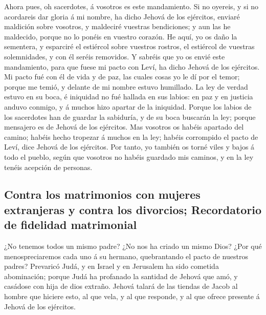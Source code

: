  Ahora pues, oh sacerdotes, á vosotros es este
mandamiento.  Si no oyereis, y si no acordareis dar gloria
á mi nombre, ha dicho Jehová de los ejércitos, enviaré maldición sobre
vosotros, y maldeciré vuestras bendiciones; y aun las he maldecido,
porque no lo ponéis en vuestro corazón.  He aquí, yo os
daño la sementera, y esparciré el estiércol sobre vuestros rostros, el
estiércol de vuestras solemnidades, y con él seréis removidos.
 Y sabréis que yo os envié este mandamiento, para que
fuese mi pacto con Leví, ha dicho Jehová de los ejércitos.
 Mi pacto fué con él de vida y de paz, las cuales cosas yo
le dí por el temor; porque me temió, y delante de mi nombre estuvo
humillado.  La ley de verdad estuvo en su boca, é
iniquidad no fué hallada en sus labios: en paz y en justicia anduvo
conmigo, y á muchos hizo apartar de la iniquidad.  Porque
los labios de los sacerdotes han de guardar la sabiduría, y de su boca
buscarán la ley; porque mensajero es de Jehová de los ejércitos.
 Mas vosotros os habéis apartado del camino; habéis hecho
tropezar á muchos en la ley; habéis corrompido el pacto de Leví, dice
Jehová de los ejércitos.  Por tanto, yo también os torné
viles y bajos á todo el pueblo, según que vosotros no habéis guardado
mis caminos, y en la ley tenéis acepción de personas.

\hypertarget{contra-los-matrimonios-con-mujeres-extranjeras-y-contra-los-divorcios-recordatorio-de-fidelidad-matrimonial}{%
\subsection{Contra los matrimonios con mujeres extranjeras y contra los
divorcios; Recordatorio de fidelidad
matrimonial}\label{contra-los-matrimonios-con-mujeres-extranjeras-y-contra-los-divorcios-recordatorio-de-fidelidad-matrimonial}}

 ¿No tenemos todos un mismo padre? ¿No nos ha criado un
mismo Dios? ¿Por qué menospreciaremos cada uno á su hermano,
quebrantando el pacto de nuestros padres?  Prevaricó
Judá, y en Israel y en Jerusalem ha sido cometida abominación; porque
Judá ha profanado la santidad de Jehová que amó, y casádose con hija de
dios extraño.  Jehová talará de las tiendas de Jacob al
hombre que hiciere esto, al que vela, y al que responde, y al que ofrece
presente á Jehová de los ejércitos.

